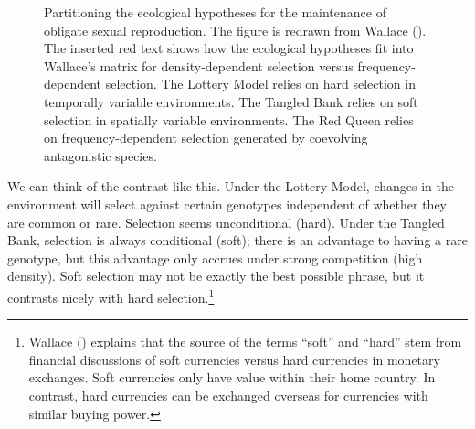 \documentclass[
  letterpaper,
]{book}
\begin{document}
\begin{figure}


\caption[Partitioning the ecological hypotheses for the maintenance of
obligate sexual reproduction]{\label{fig-2-2}Partitioning the ecological
hypotheses for the maintenance of obligate sexual reproduction. The
figure is redrawn from Wallace (). The
inserted red text shows how the ecological hypotheses fit into Wallace's
matrix for density-dependent selection versus frequency-dependent
selection. The Lottery Model relies on hard selection in temporally
variable environments. The Tangled Bank relies on soft selection in
spatially variable environments. The Red Queen relies on
frequency-dependent selection generated by coevolving antagonistic
species.}

\end{figure}%

We can think of the contrast like this. Under the Lottery Model, changes
in the environment will select against certain genotypes independent of
whether they are common or rare. Selection seems unconditional (hard).
Under the Tangled Bank, selection is always conditional (soft); there is
an advantage to having a rare genotype, but this advantage only accrues
under strong competition (high density). Soft selection may not be
exactly the best possible phrase, but it contrasts nicely with hard
selection.\footnote{Wallace () explains
  that the source of the terms ``soft'' and ``hard'' stem from financial
  discussions of soft currencies versus hard currencies in monetary
  exchanges. Soft currencies only have value within their home country.
  In contrast, hard currencies can be exchanged overseas for currencies
  with similar buying power.}
\end{document}
